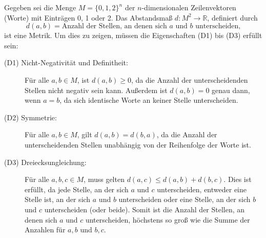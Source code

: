 
Gegeben sei die Menge \( M = \{0, 1, 2\}^n \) der \( n \)-dimensionalen Zeilenvektoren (Worte) mit Einträgen 0, 1 oder 2. Das Abstandsmaß \( d \colon M^2 \to \mathbb{R} \), definiert durch
\[ d(a, b) = \text{Anzahl der Stellen, an denen sich } a \text{ und } b \text{ unterscheiden,} \]
ist eine Metrik. Um dies zu zeigen, müssen die Eigenschaften (D1) bis (D3) erfüllt sein:

\begin{description}
    \item[(D1) Nicht-Negativität und Definitheit:] 
    Für alle \( a, b \in M \), ist \( d(a, b) \geq 0 \), da die Anzahl der unterscheidenden Stellen nicht negativ sein kann. Außerdem ist \( d(a, b) = 0 \) genau dann, wenn \( a = b \), da sich identische Worte an keiner Stelle unterscheiden.
    
    \item[(D2) Symmetrie:] 
    Für alle \( a, b \in M \), gilt \( d(a, b) = d(b, a) \), da die Anzahl der unterscheidenden Stellen unabhängig von der Reihenfolge der Worte ist.
    
    \item[(D3) Dreiecksungleichung:] 
    Für alle \( a, b, c \in M \), muss gelten \( d(a, c) \leq d(a, b) + d(b, c) \). Dies ist erfüllt, da jede Stelle, an der sich \( a \) und \( c \) unterscheiden, entweder eine Stelle ist, an der sich \( a \) und \( b \) unterscheiden oder eine Stelle, an der sich \( b \) und \( c \) unterscheiden (oder beide). Somit ist die Anzahl der Stellen, an denen sich \( a \) und \( c \) unterscheiden, höchstens so groß wie die Summe der Anzahlen für \( a, b \) und \( b, c \).
\end{description}